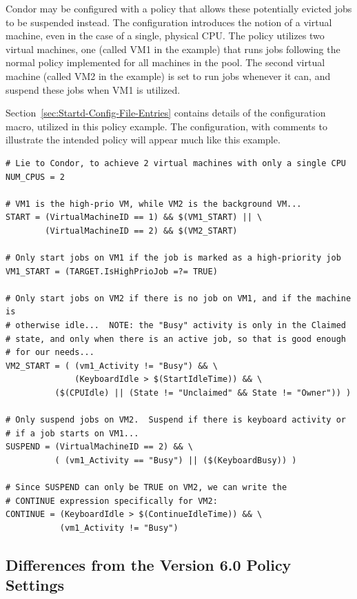 Condor may be configured with a policy that allows these potentially
evicted jobs to be suspended instead.
The configuration introduces the notion of a virtual machine,
even in the case of a single, physical CPU.
The policy utilizes two virtual machines,
one (called VM1 in the example) that runs jobs following
the normal policy implemented for all machines in the pool.
The second virtual machine (called VM2 in the example) is 
set to run jobs whenever it can, and suspend these jobs
when VM1 is utilized.

Section~\ref{sec:Startd-Config-File-Entries} contains details of
the  configuration macro,
utilized in this policy example.
The configuration, with comments to illustrate the intended policy
will appear much like this example.

\footnotesize
\begin{verbatim}
# Lie to Condor, to achieve 2 virtual machines with only a single CPU
NUM_CPUS = 2

# VM1 is the high-prio VM, while VM2 is the background VM...
START = (VirtualMachineID == 1) && $(VM1_START) || \
        (VirtualMachineID == 2) && $(VM2_START)

# Only start jobs on VM1 if the job is marked as a high-priority job 
VM1_START = (TARGET.IsHighPrioJob =?= TRUE)

# Only start jobs on VM2 if there is no job on VM1, and if the machine is
# otherwise idle...  NOTE: the "Busy" activity is only in the Claimed
# state, and only when there is an active job, so that is good enough
# for our needs...
VM2_START = ( (vm1_Activity != "Busy") && \ 
              (KeyboardIdle > $(StartIdleTime)) && \
	      ($(CPUIdle) || (State != "Unclaimed" && State != "Owner")) )

# Only suspend jobs on VM2.  Suspend if there is keyboard activity or
# if a job starts on VM1...
SUSPEND = (VirtualMachineID == 2) && \
          ( (vm1_Activity == "Busy") || ($(KeyboardBusy)) )

# Since SUSPEND can only be TRUE on VM2, we can write the
# CONTINUE expression specifically for VM2:
CONTINUE = (KeyboardIdle > $(ContinueIdleTime)) && \
           (vm1_Activity != "Busy")

\end{verbatim}
\normalsize

\subsection{\label{sec:V60-Policy-diffs}Differences from the 
Version 6.0 Policy Settings}

